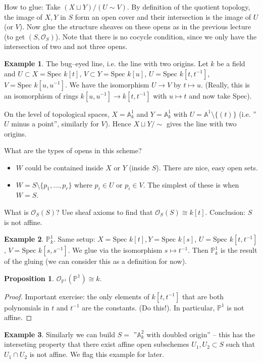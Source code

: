 \documentclass{article}
\theoremstyle{definition}
\newtheorem{prop}[theorem]{Proposition}
\newtheorem{example}{Example}[section]
\begin{document}

How to glue: Take $(X \sqcup Y)/(U \sim V)$. By definition of the quotient topology, the image of $X,Y$ in $S$ form an open cover and their intersection is the image of $U$ (or $V$). Now glue the structure sheaves on these opens as in the previous lecture (to get $(S, \mathcal{O}_S)$). Note that there is no cocycle condition, since we only have the intersection of two and not three opens.

\begin{example}
    The bug--eyed line, i.e. the line with two origins. Let $k$ be a field and $U \subset X = \text{Spec }k[t]$, $V \subset Y = \text{Spec }k[u]$, $U = \text{Spec }k[t,t^{-1}]$, $V = \text{Spec }k[u,u^{-1}]$. We have the isomorphism $U \to V$ by $t \mapsto u$. (Really, this is an isomorphism of rings $k[u,u^{-1}] \to k[t,t^{-1}]$ with $u \mapsto t$ and now take Spec).
    \vspace{1mm}
     
    On the level of topological spaces, $X = \mathbb{A}_k^1$ and $Y = \mathbb{A}_k^1$ with $U = \mathbb{A}^1\setminus \{(t)\}$ (i.e. ''$U$ minus a point'', similarly for $V$). Hence $X \sqcup Y/\sim$ gives the line with two origins.
    \vspace{1mm}
     
    What are the types of opens in this scheme? 
    \begin{itemize}
        \item $W$ could be contained inside $X$ or $Y$ (inside $S$). There are nice, easy open sets.
        \item $W = S \setminus \{p_1,\ldots,p_r\}$ where $p_i \in U$ or $p_i \in V$. The simplest of these is when $W = S$. 
    \end{itemize}
    What is $\mathcal{O}_S(S)$? Use sheaf axioms to find that $\mathcal{O}_S(S) \cong k[t]$. Conclusion: $S$ is not affine.
\end{example}
\begin{example}
    $\mathbb{P}_k^1$. Same setup: $X = \text{Spec }k[t], Y = \text{Spec }k[s]$, $U = \text{Spec }k[t,t^{-1}]$, $V = \text{Spec }k[s,s^{-1}]$. We glue via the isomorphism $s \mapsto t^{-1}$. Then $\mathbb{P}_k^1$ is the result of the gluing (we can consider this as a definition for now).
\end{example}
\begin{prop}
    $\mathcal{O}_{\mathbb{P}^1}(\mathbb{P}^1) \cong k$. 
\end{prop}
\begin{proof}
    Important exercise: the only elements of $k[t,t^{-1}]$ that are both polynomials in $t$ and $t^{-1}$ are the constants. (Do this!). In particular, $\mathbb{P}^1$ is not affine.
\end{proof}
\begin{example}
    Similarly we can build $S =$ ''$\mathbb{A}_k^2$ with doubled origin'' -- this has the interseting property that there exist affine open subschemes $U_1, U_2 \subset S$ such that $U_1 \cap U_2$ is not affine. We flag this example for later.
\end{example}
\end{document}
